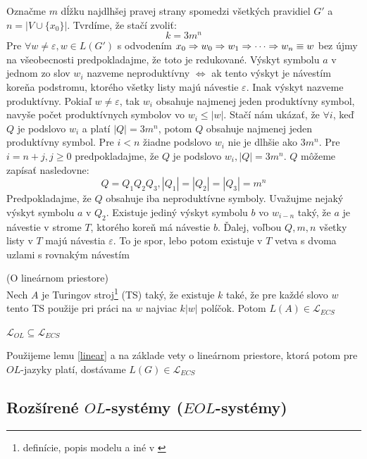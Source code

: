 \begin{dokaz}
Označme $m$ dĺžku najdlhšej pravej strany spomedzi všetkých
pravidiel $G'$ a $n=|V\cup\{x_0\}|$. Tvrdíme, že stačí zvoliť:
\[
k=3m^n
\]
Pre $\forall w\neq\varepsilon,w\in L(G')$ s odvodením $x_0\Rightarrow
w_0\Rightarrow w_1\Rightarrow\cdots\Rightarrow w_n\equiv w$ bez újmy na všeobecnosti
predpokladajme, že toto je redukované. Výskyt symbolu $a$ v jednom
zo slov $w_i$ nazveme neproduktívny $\Longleftrightarrow$ ak tento
výskyt je návestím koreňa podstromu, ktorého všetky listy majú
návestie $\varepsilon$. Inak výskyt nazveme produktívny. Pokiaľ
$w\neq\varepsilon$, tak $w_i$ obsahuje najmenej jeden produktívny
symbol, navyše počet produktívnych symbolov vo $w_i\leq|w|$. Stačí
nám ukázať, že $\forall i$, keď $Q$ je podslovo $w_i$ a platí
$|Q|=3m^n$, potom $Q$ obsahuje najmenej jeden produktívny symbol.
Pre $i<n$ žiadne podslovo $w_i$ nie je dlhšie ako $3m^n$. Pre
$i=n+j,j\geq0$ predpokladajme, že $Q$ je podslovo $w_i,|Q|=3m^n$.
$Q$ môžeme zapísať nasledovne:
\[
Q=Q_1Q_2Q_3,|Q_1|=|Q_2|=|Q_3|=m^n
\]
Predpokladajme, že $Q$ obsahuje iba neproduktívne symboly.
Uvažujme nejaký výskyt symbolu $a$ v $Q_2$. Existuje jediný výskyt
symbolu $b$ vo $w_{i-n}$ taký, že $a$ je návestie v strome $T$,
ktorého koreň má návestie $b$. Ďalej, voľbou $Q,m,n$ všetky listy
v $T$ majú návestia $\varepsilon$. To je spor, lebo potom existuje
v $T$ vetva s dvoma uzlami s rovnakým návestím
\end{dokaz}

\begin{veta}
(O lineárnom priestore)
\\ Nech $A$ je Turingov
stroj\footnote{definície, popis modelu a iné v \cite{Hopc}} (TS)
taký, že existuje $k$ také, že pre každé slovo $w$ tento TS
použije pri práci na $w$ najviac $k|w|$ políčok. Potom
$L(A)\in\mathcal{L}_{ECS}$
\end{veta}

\begin{veta}
$\mathcal{L}_{OL}\subseteq\mathcal{L}_{ECS}$
\end{veta}

\begin{dokaz}
Použijeme lemu \ref{linear} a na základe vety o lineárnom
priestore, ktorá potom pre $OL$-jazyky platí, dostávame
$L(G)\in\mathcal{L}_{ECS}$
\end{dokaz}

\subsection {Rozšírené $OL$-systémy ($EOL$-systémy)}

